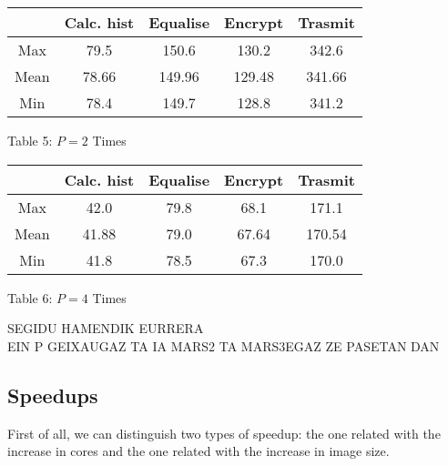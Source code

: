 \documentclass[12pt]{article}
\begin{document}
\begin{center}

\begin{tabular}{|c|c|c|c|c|}
																	\hline
			&Calc. hist	&Equalise	&	Encrypt	&	Trasmit		\\	\hline
	Max		&	79.5	&	150.6	&	130.2	&	342.6		\\	\hline
	Mean	&	78.66	&	149.96	&	129.48	&	341.66		\\	\hline
	Min		&	78.4	&	149.7	&	128.8	&	341.2		\\	\hline
\end{tabular}

\vspace{0.3cm}
Table 5: $P=2$ Times
\end{center}

\vspace{0.5cm}

\begin{center}

\begin{tabular}{|c|c|c|c|c|}
																	\hline
			&Calc. hist	&Equalise	&	Encrypt	&	Trasmit		\\	\hline
	Max		&	42.0	&	79.8	&	68.1	&	171.1		\\	\hline
	Mean	&	41.88	&	79.0	&	67.64	&	170.54		\\	\hline
	Min		&	41.8	&	78.5	&	67.3	&	170.0		\\	\hline
\end{tabular}

\vspace{0.3cm}
Table 6: $P=4$ Times
\end{center}

\vspace{0.5cm}

\begin{center}
SEGIDU HAMENDIK EURRERA\\

EIN P GEIXAUGAZ TA IA MARS2 TA MARS3EGAZ ZE PASETAN DAN
\end{center}


\subsection{Speedups}

First of all, we can distinguish two types of speedup: the one related with the increase in cores and the one related with the increase in image size.

\end{document}
